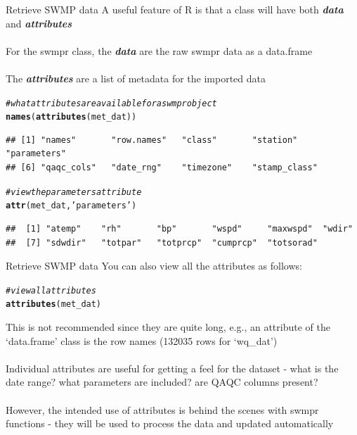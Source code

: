 \documentclass[xcolor=svgnames]{beamer}\usepackage[]{graphicx}\usepackage[]{color}
\makeatletter
\newcommand{\hlstr}[1]{\textcolor[rgb]{0.192,0.494,0.8}{#1}}%
\newcommand{\hlcom}[1]{\textcolor[rgb]{0.678,0.584,0.686}{\textit{#1}}}%
\newcommand{\hlstd}[1]{\textcolor[rgb]{0.345,0.345,0.345}{#1}}%
\newcommand{\hlkwd}[1]{\textcolor[rgb]{0.737,0.353,0.396}{\textbf{#1}}}%
\newenvironment{kframe}{%
 \def\at@end@of@kframe{}%
 \ifinner\ifhmode%
  \def\at@end@of@kframe{\end{minipage}}%
  \begin{minipage}{\columnwidth}%
 \fi\fi%
 \def\FrameCommand##1{\hskip\@totalleftmargin \hskip-\fboxsep
 \colorbox{shadecolor}{##1}\hskip-\fboxsep
     \hskip-\linewidth \hskip-\@totalleftmargin \hskip\columnwidth}%
 \MakeFramed {\advance\hsize-\width
   \@totalleftmargin\z@ \linewidth\hsize
   \@setminipage}}%
 {\par\unskip\endMakeFramed%
 \at@end@of@kframe}
\newenvironment{knitrout}{}{} %
\newcommand{\Bigtxt}[1]{\textbf{\textit{#1}}}
\makeatother
\begin{document}
\begin{frame}{Retrieve SWMP data}
A useful feature of R is that a class will have both \Bigtxt{data} and \Bigtxt{attributes}\\~\\
For the swmpr class, the \Bigtxt{data} are the raw swmpr data as a data.frame \\~\\
The \Bigtxt{attributes} are a list of metadata for the imported data
\begin{knitrout}\scriptsize
{}\color{fgcolor}\begin{kframe}
\begin{alltt}
\hlcom{# what attributes are available for a swmpr object}
\hlkwd{names}\hlstd{(}\hlkwd{attributes}\hlstd{(met_dat))}
\end{alltt}
\begin{verbatim}
## [1] "names"       "row.names"   "class"       "station"     "parameters" 
## [6] "qaqc_cols"   "date_rng"    "timezone"    "stamp_class"
\end{verbatim}
\begin{alltt}
\hlcom{# view the parameters attribute}
\hlkwd{attr}\hlstd{(met_dat,} \hlstr{'parameters'}\hlstd{)}
\end{alltt}
\begin{verbatim}
##  [1] "atemp"    "rh"       "bp"       "wspd"     "maxwspd"  "wdir"    
##  [7] "sdwdir"   "totpar"   "totprcp"  "cumprcp"  "totsorad"
\end{verbatim}
\end{kframe}
\end{knitrout}
\end{frame}

\begin{frame}[containsverbatim]{Retrieve SWMP data}
You can also view all the attributes as follows:
\begin{knitrout}\scriptsize
{}\color{fgcolor}\begin{kframe}
\begin{alltt}
\hlcom{# view all attributes}
\hlkwd{attributes}\hlstd{(met_dat)}
\end{alltt}
\end{kframe}
\end{knitrout}
This is not recommended since they are quite long, e.g., an attribute of the `data.frame' class is the row names (132035 rows for `wq\_dat') \\~\\
Individual attributes are useful for getting a feel for the dataset - what is the date range? what parameters are included? are QAQC columns present? \\~\\
However, the intended use of attributes is behind the scenes with swmpr functions - they will be used to process the data and updated automatically
\end{frame}
\end{document}
